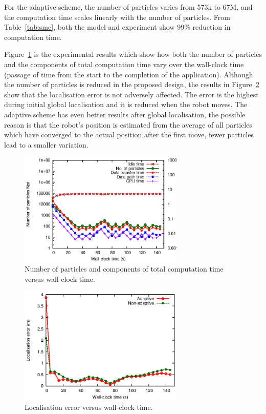 For the adaptive scheme, the number of particles varies from 573k to 67M, and the computation time scales linearly with the number of particles.
From Table~\ref{tab:smc}, both the model and experiment show 99\% reduction in computation time.

Figure~\ref{fig:adaptive} is the experimental results which show how both the number of particles and the components of total computation time vary over the wall-clock time (passage of time from the start to the completion of the application).
Although the number of particles is reduced in the proposed design, the results in Figure~\ref{fig:error} show that the localisation error is not adversely affected.
The error is the highest during initial global localisation and it is reduced when the robot moves.
The adaptive scheme has even better results after global localisation, the possible reason is that the robot's position is estimated from the average of all particles which have converged to the actual position after the first move, fewer particles lead to a smaller variation.

\begin{figure}[t!]
\centering
\includegraphics[width=0.7\textwidth]{4_adaptation/figures/fig_adaptive}
\caption{Number of particles and components of total computation time versus wall-clock time.}
\label{fig:adaptive}
\end{figure}

\begin{figure}[t!]
\centering
\includegraphics[width=0.7\textwidth]{4_adaptation/figures/fig_error}
\caption{Localisation error versus wall-clock time.}
\label{fig:error}
\end{figure}

